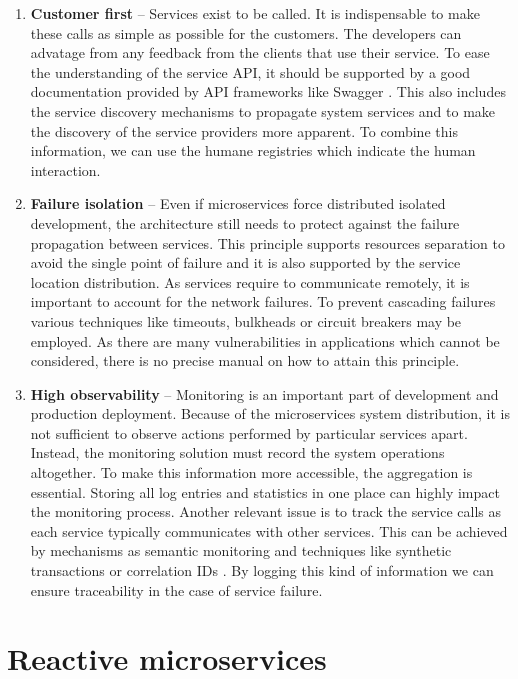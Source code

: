\documentclass[oneside,
  digital, %
  table,   %
  lof,     %
  lot,     %
]{fithesis3}
\begin{document}
\begin{enumerate}
	\item \textbf{Customer first} -- Services exist to be called. It is indispensable to make these calls as simple as possible for the customers. The developers can advatage from any feedback from the clients that use their service. To ease the understanding of the service API, it should be supported by a good documentation provided by API frameworks like Swagger \cite{swagger}. This also includes the service discovery mechanisms to propagate system services and to make the discovery of the service providers more apparent. To combine this information, we can use the humane registries \cite{humane_registry} which indicate the human interaction. 
	
	\item \textbf{Failure isolation} -- Even if microservices force distributed isolated development, the architecture still needs to protect against the failure propagation between services. This principle supports resources separation to avoid the single point of failure and it is also supported by the service location distribution. As services require to communicate remotely, it is important to account for the network failures. To prevent cascading failures various techniques like timeouts, bulkheads or circuit breakers \cite{release_it} may be employed. As there are many vulnerabilities in applications which cannot be considered, there is no precise manual on how to attain this principle.
	
	\item \textbf{High observability} -- Monitoring is an important part of development and production deployment. Because of the microservices system distribution, it is not sufficient to observe actions performed by particular services apart. Instead, the monitoring solution must record the system operations altogether. To make this information more accessible, the aggregation is essential. Storing all log entries and statistics in one place can highly impact the monitoring process. Another relevant issue is to track the service calls as each service typically communicates with other services. This can be achieved by mechanisms as semantic monitoring and techniques like synthetic transactions or correlation IDs \cite{building_ms}. By logging this kind of information we can ensure traceability in the case of service failure.
	
\end{enumerate}

\section{Reactive microservices}
\end{document}

